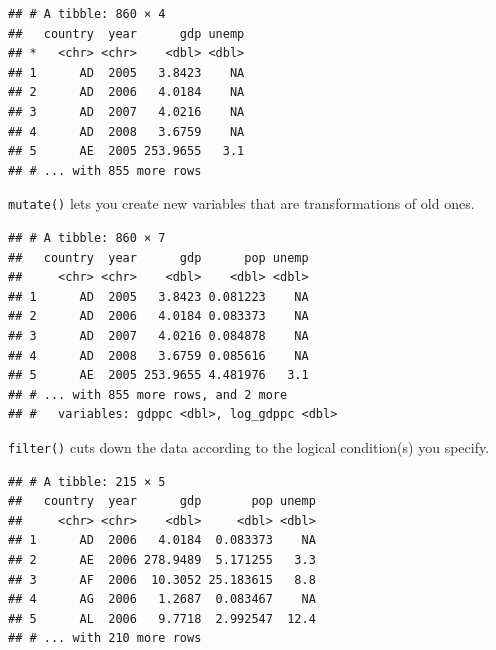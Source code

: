 \documentclass[12pt,oneside,openany]{tufte-book}
\newenvironment{Shaded}{}{}
\newcommand{\KeywordTok}[1]{\textcolor[rgb]{0.00,0.44,0.13}{\textbf{{#1}}}}
\newcommand{\DataTypeTok}[1]{\textcolor[rgb]{0.56,0.13,0.00}{{#1}}}
\newcommand{\DecValTok}[1]{\textcolor[rgb]{0.25,0.63,0.44}{{#1}}}
\newcommand{\StringTok}[1]{\textcolor[rgb]{0.25,0.44,0.63}{{#1}}}
\newcommand{\NormalTok}[1]{{#1}}
\begin{document}
\begin{verbatim}
## # A tibble: 860 × 4
##   country  year      gdp unemp
## *   <chr> <chr>    <dbl> <dbl>
## 1      AD  2005   3.8423    NA
## 2      AD  2006   4.0184    NA
## 3      AD  2007   4.0216    NA
## 4      AD  2008   3.6759    NA
## 5      AE  2005 253.9655   3.1
## # ... with 855 more rows
\end{verbatim}

\texttt{mutate()} lets you create new variables that are transformations
of old ones.

\begin{Shaded}
\end{Shaded}

\begin{verbatim}
## # A tibble: 860 × 7
##   country  year      gdp      pop unemp
##     <chr> <chr>    <dbl>    <dbl> <dbl>
## 1      AD  2005   3.8423 0.081223    NA
## 2      AD  2006   4.0184 0.083373    NA
## 3      AD  2007   4.0216 0.084878    NA
## 4      AD  2008   3.6759 0.085616    NA
## 5      AE  2005 253.9655 4.481976   3.1
## # ... with 855 more rows, and 2 more
## #   variables: gdppc <dbl>, log_gdppc <dbl>
\end{verbatim}

\texttt{filter()} cuts down the data according to the logical
condition(s) you specify.

\begin{Shaded}
\end{Shaded}

\begin{verbatim}
## # A tibble: 215 × 5
##   country  year      gdp       pop unemp
##     <chr> <chr>    <dbl>     <dbl> <dbl>
## 1      AD  2006   4.0184  0.083373    NA
## 2      AE  2006 278.9489  5.171255   3.3
## 3      AF  2006  10.3052 25.183615   8.8
## 4      AG  2006   1.2687  0.083467    NA
## 5      AL  2006   9.7718  2.992547  12.4
## # ... with 210 more rows
\end{verbatim}
\end{document}
